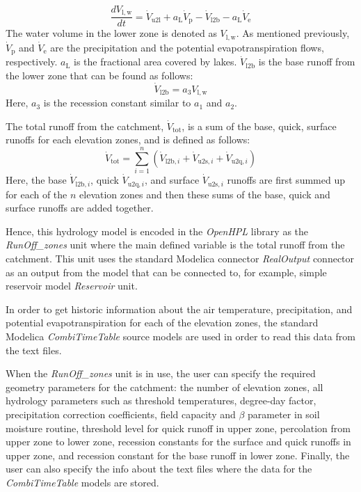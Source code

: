 \documentclass[%
]{USN-PhD}
\begin{document}
\begin{equation}\label{eq:eq32}
\frac{dV_\mathrm{l,w}}{dt}=\dot{V}_\mathrm{u2l}+a_\mathrm{L}\dot{V}_\mathrm{p}-\dot{V}_\mathrm{l2b}-a_\mathrm{L}\dot{V}_\mathrm{e}
\end{equation}
The water volume in the lower zone is denoted as $V_\mathrm{l,w}$. As mentioned previously, $\dot{V}_\mathrm{p}$ and $\dot{V}_\mathrm{e}$ are the precipitation and the potential evapotranspiration flows, respectively. $a_\mathrm{L}$ is the fractional area covered by lakes. $\dot{V}_\mathrm{l2b}$ is the base runoff from the lower zone that can be found as follows:
\begin{equation}\label{eq:eq33}
\dot{V}_\mathrm{l2b}=a_3V_\mathrm{l,w}
\end{equation}
Here, $a_3$ is the recession constant similar to $a_1$ and $a_2$.

The total runoff from the catchment, $\dot{V}_\mathrm{tot}$, is a sum of the base, quick, surface runoffs for each elevation zones, and is defined as follows:
\begin{equation}\label{eq:eq34}
\dot{V}_\mathrm{tot}=\sum\limits_{i=1}^n(\dot{V}_{\mathrm{l2b},i}+\dot{V}_{\mathrm{u2s},i}+\dot{V}_{\mathrm{u2q},i})
\end{equation}
Here, the base $\dot{V}_{\mathrm{l2b},i}$, quick $\dot{V}_{\mathrm{u2q},i}$, and surface $\dot{V}_{\mathrm{u2s},i}$ runoffs are first summed up for each of the $n$ elevation zones and then these sums of the base, quick and surface runoffs are added together.

Hence, this hydrology model is encoded in the \emph{OpenHPL} library as the \emph{RunOff\_zones} unit where the main defined variable is the total runoff from the catchment. This unit uses the standard Modelica connector \emph{RealOutput} connector as an output from the model that can be connected to, for example, simple reservoir model \emph{Reservoir} unit.

In order to get historic information about the air temperature, precipitation, and potential evapotranspiration for each of the elevation zones, the standard Modelica \emph{CombiTimeTable} source models are used in order to read this data from the text files.

When the \emph{RunOff\_zones} unit is in use, the user can specify the required geometry parameters for the catchment: the number of elevation zones, all hydrology parameters such as threshold temperatures, degree-day factor, precipitation correction coefficients, field capacity and $\beta$ parameter in soil moisture routine, threshold level for quick runoff in upper zone, percolation from upper zone to lower zone, recession constants for the surface and quick runoffs in upper zone, and recession constant for the base runoff in lower zone. Finally, the user can also specify the info about the text files where the data for the \emph{CombiTimeTable} models are stored.
\end{document}
